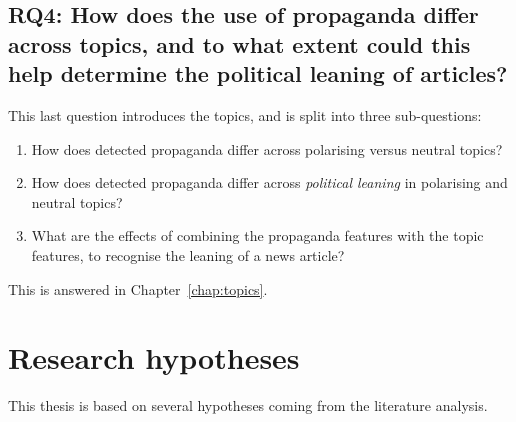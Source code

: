 \subsection*{RQ4: How does the use of propaganda differ across topics, and to what extent could this help determine the political leaning of articles?}

This last question introduces the topics, and is split into three sub-questions:

\begin{enumerate}[label={\textbf{RQ4.\arabic*:}},leftmargin=2cm]
    \item How does detected propaganda differ across polarising versus neutral topics?
    \item How does detected propaganda differ across \emph{political leaning} in polarising and neutral topics?
    \item What are the effects of combining the propaganda features with the topic features, to recognise the leaning of a news article?
\end{enumerate}

This is answered in Chapter~\ref{chap:topics}.





\section{\statusgreen Research hypotheses}
\label{sec:intro_hyp}

This thesis is based on several hypotheses coming from the literature analysis.

